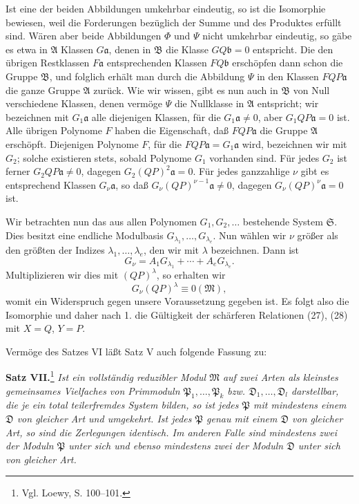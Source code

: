 \documentclass[11pt]{article}
\newcommand{\mM}{\mathfrak{M}}
\newcommand{\mA}{\mathfrak{A}}
\newcommand{\mB}{\mathfrak{B}}
\newcommand{\ma}{\mathfrak{a}}
\newcommand{\mb}{\mathfrak{b}}
\providecommand{\mP}{\mathfrak{P}}
\providecommand{\mS}{\mathfrak{S}}
\providecommand{\mD}{\mathfrak{D}}
\begin{document}
Ist eine der beiden Abbildungen umkehrbar eindeutig, so ist die Isomorphie bewiesen, weil die Forderungen bezüglich der Summe und des Produktes erfüllt sind. Wären aber beide Abbildungen $\Phi$ und $\Psi$ nicht umkehrbar eindeutig, so gäbe es etwa in $\mA$ Klassen $G\ma$, denen in $\mB$ die Klasse $GQ\mb=0$ entspricht. Die den übrigen Restklassen $F\ma$ entsprechenden Klassen $FQ\mb$ erschöpfen dann schon die Gruppe $\mB$, und folglich erhält man durch die Abbildung $\Psi$ in den Klassen $FQP\ma$ die ganze Gruppe $\mA$ zurück. Wie wir wissen, gibt es nun auch in $\mB$ von Null verschiedene Klassen, denen vermöge $\Psi$ die Nullklasse in $\mA$ entspricht; wir bezeichnen mit $G_1\ma$ alle diejenigen Klassen, für die $G_1\ma\ne0$, aber $G_1QP\ma=0$ ist. Alle übrigen Polynome $F$ haben die Eigenschaft, daß $FQP\ma$ die Gruppe $\mA$ erschöpft. Diejenigen Polynome $F$, für die $FQP\ma=G_1\ma$ wird, bezeichnen wir mit $G_2$; solche existieren stets, sobald Polynome $G_1$ vorhanden sind. Für jedes $G_2$ ist ferner $G_2QP\ma\ne0$, dagegen $G_2(QP)^2\ma=0$. Für jedes ganzzahlige $\nu$ gibt es entsprechend Klassen $G_\nu\ma$, so daß $G_\nu(QP)^{\nu-1}\ma\ne0$, dagegen $G_\nu(QP)^\nu\ma=0$ ist.

Wir betrachten nun das aus allen Polynomen $G_1,G_2,
\ldots$ bestehende System $\mS$. Dies besitzt eine endliche Modulbasis $G_{\lambda_1},\ldots,G_{\lambda_e}$. Nun wählen wir $\nu$ größer als den größten der Indizes $\lambda_1,
\ldots,\lambda_e$, den wir mit $\lambda$ bezeichnen. Dann ist
\[
 G_\nu=A_1G_{\lambda_1}+\cdots+A_eG_{\lambda_e}.
\]
Multiplizieren wir dies mit $(QP)^\lambda$, so erhalten wir
\[
 G_\nu(QP)^\lambda\equiv0(\mM),
\]
womit ein Widerspruch gegen unsere Voraussetzung gegeben ist. Es folgt also die Isomorphie und daher nach 1. die Gültigkeit der schärferen Relationen (27), (28) mit $X=Q$, $Y=P$.

Vermöge des Satzes VI läßt Satz V auch folgende Fassung zu:

\textbf{Satz VII.}\footnote{Vgl. Loewy, S. 100--101.} \emph{Ist ein vollständig reduzibler Modul $\mM$ auf zwei Arten als kleinstes gemeinsames Vielfaches von Primmoduln $\mP_1,\ldots,\mP_k$ bzw. $\mD_1,\ldots,\mD_l$ darstellbar, die je ein total teilerfremdes System bilden, so ist jedes $\mP$ mit mindestens einem $\mD$ von gleicher Art und umgekehrt. Ist jedes $\mP$ genau mit einem $\mD$ von gleicher Art, so sind die Zerlegungen identisch. Im anderen Falle sind mindestens zwei der Moduln $\mP$ unter sich und ebenso mindestens zwei der Moduln $\mD$ unter sich von gleicher Art.}
\clearpage
\setcounter{footnote}{19}
\end{document}

